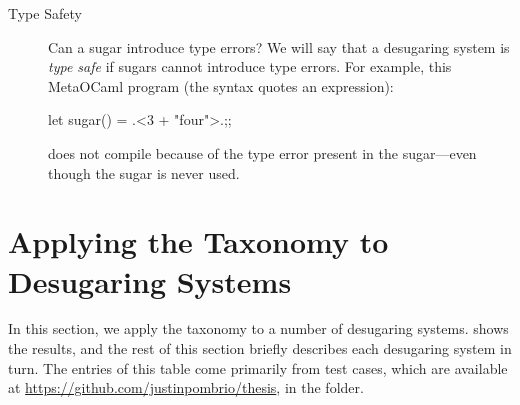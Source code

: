 \begin{description}
  \item[Type Safety] Can a sugar introduce type errors? We will say
    that a desugaring system is \emph{type safe} if sugars cannot
    introduce type errors. For example, this MetaOCaml program (the
     syntax quotes an expression):
\begin{CorrectlyIndentedCodes}
let sugar() = .<3 + "four">.;;
\end{CorrectlyIndentedCodes}
    does not compile because of the type error present in the
    sugar---even though the sugar is never used.
\end{description}

\section{Applying the Taxonomy to Desugaring Systems}\label{sec:taxonomy-systems}

In this section, we apply the taxonomy to a number of desugaring
systems.
 shows the results, and the rest
of this section briefly describes each desugaring system in turn. The
entries of this table come primarily from test cases, which are
available at \url{https://github.com/justinpombrio/thesis}, in the
 folder.

